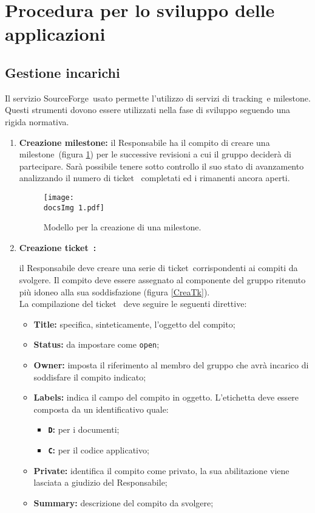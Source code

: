 \section{Procedura per lo sviluppo delle applicazioni}{

\subsection{Gestione incarichi}{
	Il servizio SourceForge\g \ usato permette l'utilizzo di servizi di tracking\g \ e milestone\g .\\
	Questi strumenti dovono essere utilizzati nella fase di sviluppo seguendo una rigida normativa.

	\begin{enumerate}
		\item \textbf{Creazione milestone\g:} \label{milestone} {
			il Responsabile ha il compito di creare una milestone\g \ (figura \ref{CreaMS}) per le successive revisioni a cui il gruppo deciderà di partecipare. Sarà possibile tenere sotto controllo il suo stato di avanzamento analizzando il numero di ticket\g~ completati ed i rimanenti ancora aperti.
		}
		
		\begin{center}
			\begin{figure}[h]
				\centering
				\label{CreaMS}
				\texttt{[image: \\docsImg 1.pdf]}
				\caption{Modello per la creazione di una milestone\g.}	
			\end{figure}
		\end{center}

		\item \textbf{Creazione ticket\g~:} \label{creazioneTicket} {
			il Responsabile deve creare una serie di ticket\g \  corrispondenti ai compiti da svolgere. Il compito deve essere assegnato al componente del gruppo ritenuto più idoneo alla sua soddisfazione (figura \ref{CreaTk}).\\
			La compilazione del ticket\g~ deve seguire le seguenti direttive:
			\begin{itemize}
				\item \textbf{Title:} specifica, sinteticamente, l'oggetto del compito;
				\item \textbf{Status:} da impostare come \texttt{open};
				\item \textbf{Owner:} imposta il riferimento al membro del gruppo che avrà incarico di soddisfare il compito indicato;
				\item \textbf{Labels:} indica il campo del compito in oggetto. L'etichetta deve essere composta da un identificativo quale:
					\begin{itemize}
						\item [] \textbf{\texttt{D}:} per i documenti;
						\item [] \textbf{\texttt{C}:} per il codice applicativo;
					\end{itemize}
				\item \textbf{Private:} identifica il compito come privato, la sua abilitazione viene lasciata a giudizio del Responsabile;
				\item \textbf{Summary:} descrizione del compito da svolgere;
			\end{itemize}
		}


\end{enumerate}}}
